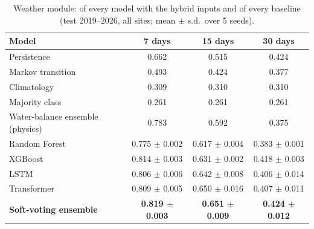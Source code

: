 \begin{table}[H]
\centering
\caption{Weather module: \mf{} of every model with the hybrid inputs and of every baseline (test 2019--2026, all sites; mean $\pm$ s.d.\ over 5 seeds).}
\label{tab:w_models}
\small
\begin{tabular}{@{}lccc@{}}
\toprule
\textbf{Model} & \textbf{7 days} & \textbf{15 days} & \textbf{30 days} \\
\midrule
Persistence & 0.662 & 0.515 & 0.424 \\
Markov transition & 0.493 & 0.424 & 0.377 \\
Climatology & 0.309 & 0.310 & 0.310 \\
Majority class & 0.261 & 0.261 & 0.261 \\
Water-balance ensemble (physics) & 0.783 & 0.592 & 0.375 \\
\midrule
Random Forest & 0.775 $\pm$ 0.002 & 0.617 $\pm$ 0.004 & 0.383 $\pm$ 0.001 \\
XGBoost & 0.814 $\pm$ 0.003 & 0.631 $\pm$ 0.002 & 0.418 $\pm$ 0.003 \\
LSTM & 0.806 $\pm$ 0.006 & 0.642 $\pm$ 0.008 & 0.406 $\pm$ 0.014 \\
Transformer & 0.809 $\pm$ 0.005 & 0.650 $\pm$ 0.016 & 0.407 $\pm$ 0.011 \\
\textbf{Soft-voting ensemble} & \textbf{0.819 $\pm$ 0.003} & \textbf{0.651 $\pm$ 0.009} & \textbf{0.424 $\pm$ 0.012} \\
\bottomrule
\end{tabular}
\end{table}
